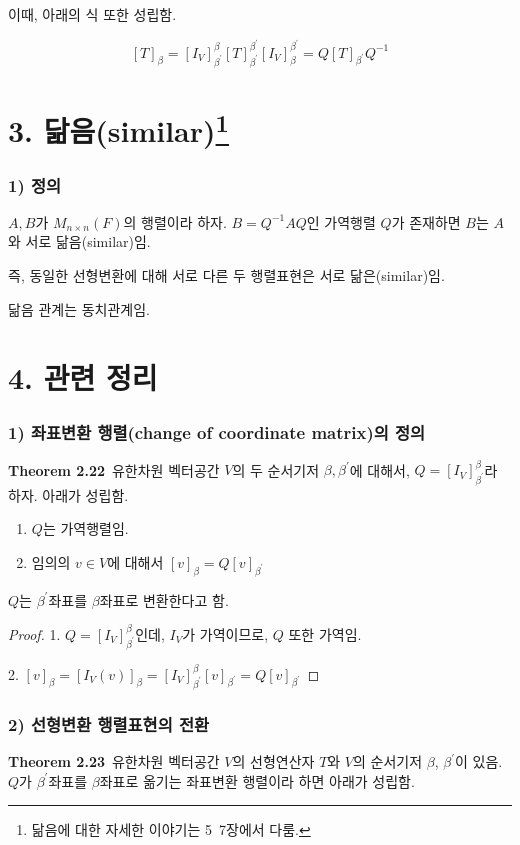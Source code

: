 \documentclass[10pt, a4paper]{article}
\begin{document}
이때, 아래의 식 또한 성립함.

\[
[T]_{\beta}=[I_V]^{\beta}_{\beta^\prime}[T]^{\beta^{\prime}}_{\beta^{\prime}}[I_V]^{\beta^{\prime}}_{\beta}=Q[T]_{\beta^{\prime}}Q^{-1}
\]

\section*{3. 닮음(similar)\footnote{닮음에 대한 자세한 이야기는 5~7장에서 다룸.}}
\subsubsection*{1) 정의}
$A,B$가 $M_{n \times n}(F)$의 행렬이라 하자. $B=Q^{-1}AQ$인 가역행렬 $Q$가 존재하면 $B$는 $A$와 서로 닮음(similar)임.

즉, 동일한 선형변환에 대해 서로 다른 두 행렬표현은 서로 닮은(similar)임.

닮음 관계는 동치관계임.


\newpage


\section*{4. 관련 정리}
\subsubsection*{1) 좌표변환 행렬(change of coordinate matrix)의 정의}
\textbf{Theorem 2.22}\, 유한차원 벡터공간 $V$의 두 순서기저 $\beta, \beta^{\prime}$에 대해서, $Q=[I_V]^{\beta}_{\beta^{\prime}}$라 하자. 아래가 성립함.

\begin{enumerate}
    \item $Q$는 가역행렬임.
    \item 임의의 $v \in V$에 대해서 $[v]_{\beta}=Q[v]_{\beta^{\prime}}$
\end{enumerate}

$Q$는 $\beta^{\prime}$좌표를 $\beta$좌표로 변환한다고 함.

\begin{proof}
1. $Q=[I_V]^{\beta}_{\beta^{\prime}}$인데, $I_V$가 가역이므로, $Q$ 또한 가역임.

2. $[v]_{\beta}=[I_V(v)]_{\beta}=[I_V]_{\beta^{\prime}}^{\beta}[v]_{\beta^{\prime}}=Q[v]_{\beta^{\prime}}$
\end{proof}

\subsubsection*{2) 선형변환 행렬표현의 전환}
\textbf{Theorem 2.23}\, 유한차원 벡터공간 $V$의 선형연산자 $T$와 $V$의 순서기저 $\beta$, $\beta^{\prime}$이 있음. $Q$가 $\beta^{\prime}$좌표를 $\beta$좌표로 옮기는 좌표변환 행렬이라 하면 아래가 성립함.
\end{document}
